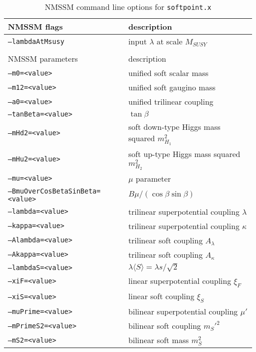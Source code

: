 \documentclass[final,3p,times,pdflatex]{elsarticle}
\def\code#1{\small{\tt #1}\normalsize}
\begin{document}
\begin{table}[tbh]
  \centering
  \begin{tabular}{ll}
    NMSSM flags & description \\
    \hline
    \code{--lambdaAtMsusy} & input $\lambda$ at scale $M_{SUSY}$ \\
    \hline\\
    NMSSM parameters & description \\
    \hline
    \code{--m0=<value>} & unified soft scalar mass \\
    \code{--m12=<value>} & unified soft gaugino mass \\
    \code{--a0=<value>} & unified trilinear coupling \\
    \code{--tanBeta=<value>} & $\tan\beta$ \\
    \code{--mHd2=<value>} & soft down-type Higgs mass squared $m_{H_1}^2$ \\
    \code{--mHu2=<value>} & soft up-type Higgs mass squared $m_{H_2}^2$ \\
    \code{--mu=<value>} & $\mu$ parameter \\
    \code{--BmuOverCosBetaSinBeta=<value>} & $B\mu/(\cos\beta \sin\beta)$ \\
    \code{--lambda=<value>} & trilinear superpotential coupling $\lambda$ \\
    \code{--kappa=<value>} & trilinear superpotential coupling $\kappa$ \\
    \code{--Alambda=<value>} & trilinear soft coupling $A_\lambda$ \\
    \code{--Akappa=<value>} & trilinear soft coupling $A_\kappa$ \\
    \code{--lambdaS=<value>} & $\lambda \langle S \rangle = \lambda s / \sqrt{2}$ \\
    \code{--xiF=<value>} & linear superpotential coupling $\xi_F$ \\
    \code{--xiS=<value>} & linear soft coupling $\xi_S$ \\
    \code{--muPrime=<value>} & bilinear superpotential coupling $\mu'$ \\
    \code{--mPrimeS2=<value>} & bilinear soft coupling $m_{S}'^2$ \\
    \code{--mS2=<value>} & bilinear soft mass $m_{S}^2$ \\
    \hline
  \end{tabular}
  \caption{NMSSM command line options for \code{softpoint.x}}
  \label{tab:nmssm-cmd-line-options}
\end{table}
\end{document}
